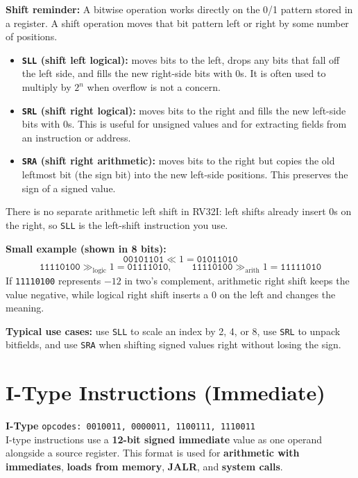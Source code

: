 \documentclass[12pt, a4paper, oneside]{book}
\begin{document}
\begin{keybox}
\textbf{\color{accentblue}Shift reminder:} A bitwise operation works directly on the 0/1 pattern stored in a register. A shift operation moves that bit pattern left or right by some number of positions.

\begin{itemize}
  \item \textbf{\texttt{SLL} (shift left logical):} moves bits to the left, drops any bits that fall off the left side, and fills the new right-side bits with 0s. It is often used to multiply by $2^n$ when overflow is not a concern.
  \item \textbf{\texttt{SRL} (shift right logical):} moves bits to the right and fills the new left-side bits with 0s. This is useful for unsigned values and for extracting fields from an instruction or address.
  \item \textbf{\texttt{SRA} (shift right arithmetic):} moves bits to the right but copies the old leftmost bit (the sign bit) into the new left-side positions. This preserves the sign of a signed value.
\end{itemize}

There is no separate arithmetic left shift in RV32I: left shifts already insert 0s on the right, so \texttt{SLL} is the left-shift instruction you use.

\textbf{Small example (shown in 8 bits):}
\[
\texttt{00101101} \ll 1 = \texttt{01011010}
\]
\[
\texttt{11110100} \gg_\text{logic} 1 = \texttt{01111010}, \qquad
\texttt{11110100} \gg_\text{arith} 1 = \texttt{11111010}
\]
If \texttt{11110100} represents $-12$ in two's complement, arithmetic right shift keeps the value negative, while logical right shift inserts a 0 on the left and changes the meaning.

\textbf{Typical use cases:} use \texttt{SLL} to scale an index by 2, 4, or 8, use \texttt{SRL} to unpack bitfields, and use \texttt{SRA} when shifting signed values right without losing the sign.
\end{keybox}

\newpage

\section{I-Type Instructions (Immediate)}

\begin{infobox}
\textbf{\color{itypecolor}\Large I-Type} \hfill \texttt{opcodes: 0010011, 0000011, 1100111, 1110011}\\[6pt]
I-type instructions use a \textbf{12-bit signed immediate} value as one operand alongside a source register. This format is used for \textbf{arithmetic with immediates}, \textbf{loads from memory}, \textbf{JALR}, and \textbf{system calls}.
\end{infobox}
\end{document}
